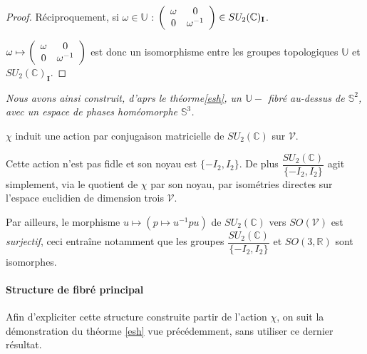 \begin{proof}
\par
R\'eciproquement, si $\omega\in\mathbb{U}$ : $\left(\begin{array}{cc}\omega&0\\0&\omega^{-1}\end{array}\right)\in SU_2(\mathbb{C})_{\mathbf{I}}$.

\par
$\omega\mapsto\left(\begin{array}{cc}\omega&0\\0&\omega^{-1}\end{array}\right)$ est donc un isomorphisme entre les groupes topologiques $\mathbb{U}$ et $SU_2(\mathbb{C})_{\mathbf{I}}$.
\end{proof}

\etoile
\emph{Nous avons ainsi construit, d'aprs le th\'eorme\ref{esh}, un $\mathbb{U}-$ fibr\'e au-dessus de $\mathbb{S}^2$, %
avec un espace de phases hom\'eomorphe  $\mathbb{S}^3$.}

\begin{rema}
$\chi$ induit une action par conjugaison matricielle de $SU_2(\mathbb{C})$ sur $\mathcal{V}$.
\par
Cette action n'est pas fidle et son noyau est $\{-I_2,I_2\}$. %
De plus $\dfrac{SU_2(\mathbb{C})}{\{-I_2,I_2\}}$ agit simplement, via le quotient de $\chi$ par son noyau, %
par isom\'etries directes sur l'espace euclidien de dimension trois $\mathcal{V}$.

\par
Par ailleurs, le morphisme $u\mapsto \left(p\mapsto u^{-1}pu\right)$ de $SU_2(\mathbb{C})$ vers $SO(\mathcal{V})$ est \emph{surjectif}, %
ceci entra\^ine notamment que les groupes $\dfrac{SU_2(\mathbb{C})}{\{-I_2,I_2\}}$ et $SO(3,\mathbb{R})$ sont isomorphes.
\end{rema}

\begin{comment}
\etoile
D\'ecliner la d\'emonstration du th\'eor\g{e}me\ref{esh} au cas particulier de $\mathbb{S}^3\twoheadrightarrow\dfrac{\mathbb{S}^3}{\mathbb{S}^3_{\mathbf{I}}}$ %
pour construire explicitement un syst\g{e}me de trivialisations.

\par
Formule explicite pour une section ? Interpr\'etation g\'eom\'etrique ?
\end{comment}

\paragraph{Structure de fibr\'e principal}

\par
Afin d'expliciter cette structure construite  partir de l'action $\chi$, %
on suit la d\'emonstration du th\'eorme \ref{esh} vue pr\'ec\'edemment, sans utiliser ce dernier r\'esultat.

